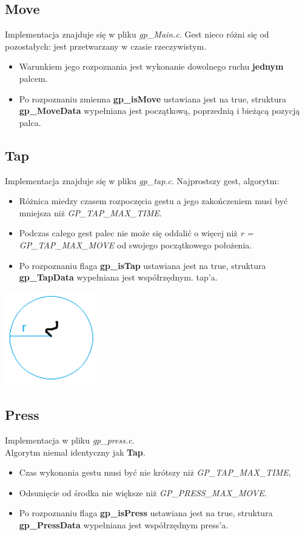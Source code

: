 \documentclass[a4paper,12pt]{article}
\begin{document}
	\subsection{Move}
		Implementacja znajduje się w pliku \textit{gp_Main.c}.
		Gest nieco różni się od pozostałych: jest przetwarzany w czasie rzeczywistym.
		\begin{itemize}
			\item Warunkiem jego rozpoznania jest wykonanie dowolnego ruchu \textbf{jednym} palcem.
			\item Po rozpoznaniu zmienna \textbf{gp_isMove} ustawiana jest na true, struktura \textbf{gp_MoveData} wypełniana jest początkową, poprzednią i bieżącą pozycją palca.
		\end{itemize}				
		
		
	\subsection{Tap}

	 Implementacja znajduje się w pliku \textit{gp_tap.c}. Najprostszy gest, algorytm: 
	\begin{itemize}
		\item Różnica miedzy czasem rozpoczęcia gestu a jego zakończeniem musi być mniejsza niż \textit{GP_TAP_MAX_TIME}.
		\item Podczas całego gest palec nie może się oddalić o więcej niż \textit{r = GP_TAP_MAX_MOVE} od swojego początkowego położenia.
		\item Po rozpoznaniu flaga \textbf{gp_isTap} ustawiana jest na true, struktura \textbf{gp_TapData} wypełniana jest współrzędnym. tap'a.
	
	\end{itemize}
	\includegraphics[width=0.3\textwidth]{../data/ImplTap}
	
	
	\subsection{Press}
	Implementacja w pliku \textit{gp_press.c}. \\
	Algorytm niemal identyczny jak \textbf{Tap}.
	\begin{itemize} 
		\item Czas wykonania gestu musi być nie krótszy niż \textit{GP_TAP_MAX_TIME},
		\item Odsunięcie od środka nie większe niż \textit{GP_PRESS_MAX_MOVE}.
		\item Po rozpoznaniu flaga \textbf{gp_isPress} ustawiana jest na true, struktura \textbf{gp_PressData} wypełniana jest współrzędnym press'a.
	\end{itemize}
	
\end{document}

